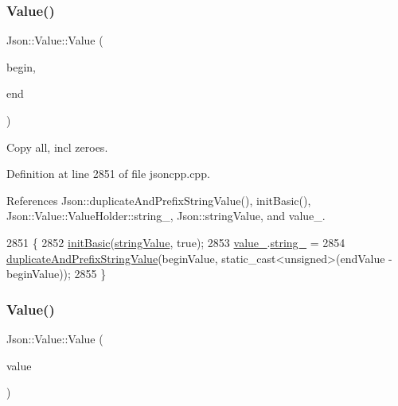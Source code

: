\subsubsection{\texorpdfstring{Value()}{Value()}\hspace{0.1cm}{\footnotesize\ttfamily [8/12]}}
{\footnotesize\ttfamily Json\+::\+Value\+::\+Value (\begin{DoxyParamCaption}\item[{const char $\ast$}]{begin,  }\item[{const char $\ast$}]{end }\end{DoxyParamCaption})}



Copy all, incl zeroes. 



Definition at line 2851 of file jsoncpp.\+cpp.



References Json\+::duplicate\+And\+Prefix\+String\+Value(), init\+Basic(), Json\+::\+Value\+::\+Value\+Holder\+::string\+\_\+, Json\+::string\+Value, and value\+\_\+.


\begin{DoxyCode}
2851                                                          \{
2852   \hyperlink{class_json_1_1_value_a32b86b71564157f40f880f5736be822a}{initBasic}(\hyperlink{namespace_json_a7d654b75c16a57007925868e38212b4ea804ef857affea2d415843c73f261c258}{stringValue}, \textcolor{keyword}{true});
2853   \hyperlink{class_json_1_1_value_aef578244546212705b9f81eb84d7e151}{value\_}.\hyperlink{union_json_1_1_value_1_1_value_holder_a70ac2b153bc405527baa3850d2ddc3cb}{string\_} =
2854       \hyperlink{namespace_json_a9795a09a0141d1f12d307c4386aeaee6}{duplicateAndPrefixStringValue}(beginValue, static\_cast<unsigned>(endValue
       - beginValue));
2855 \}
\end{DoxyCode}
\mbox{\label{class_json_1_1_value_a081830e95f88a37054da7e46c65b0766}} 
\subsubsection{\texorpdfstring{Value()}{Value()}\hspace{0.1cm}{\footnotesize\ttfamily [9/12]}}
{\footnotesize\ttfamily Json\+::\+Value\+::\+Value (\begin{DoxyParamCaption}\item[{const \hyperlink{class_json_1_1_static_string}{Static\+String} \&}]{value }\end{DoxyParamCaption})}



